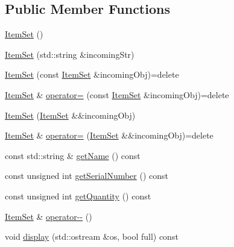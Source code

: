\subsection*{Public Member Functions}
\begin{DoxyCompactItemize}
\item 
\mbox{\hyperlink{classsict_1_1ItemSet_affbe4ff1fa57325fb27222d39fd780cb}{Item\+Set}} ()
\item 
\mbox{\hyperlink{classsict_1_1ItemSet_ae90c48652022bb74c04774fe0b59eadc}{Item\+Set}} (std\+::string \&incoming\+Str)
\item 
\mbox{\hyperlink{classsict_1_1ItemSet_ac5814fc09385ea14c8776fd3d9920d16}{Item\+Set}} (const \mbox{\hyperlink{classsict_1_1ItemSet}{Item\+Set}} \&incoming\+Obj)=delete
\item 
\mbox{\hyperlink{classsict_1_1ItemSet}{Item\+Set}} \& \mbox{\hyperlink{classsict_1_1ItemSet_a76155437cf9aef0adf0b26ed44383b85}{operator=}} (const \mbox{\hyperlink{classsict_1_1ItemSet}{Item\+Set}} \&incoming\+Obj)=delete
\item 
\mbox{\hyperlink{classsict_1_1ItemSet_a5efb673bc5cad8a35404fef1dd43a78b}{Item\+Set}} (\mbox{\hyperlink{classsict_1_1ItemSet}{Item\+Set}} \&\&incoming\+Obj)
\item 
\mbox{\hyperlink{classsict_1_1ItemSet}{Item\+Set}} \& \mbox{\hyperlink{classsict_1_1ItemSet_ae3b1dbf59c6fd7cf463459290c0421da}{operator=}} (\mbox{\hyperlink{classsict_1_1ItemSet}{Item\+Set}} \&\&incoming\+Obj)=delete
\item 
const std\+::string \& \mbox{\hyperlink{classsict_1_1ItemSet_a5182b65c6ac91c27a125641139b448cd}{get\+Name}} () const
\item 
const unsigned int \mbox{\hyperlink{classsict_1_1ItemSet_ab67dbc2189195da464da446dad1238a9}{get\+Serial\+Number}} () const
\item 
const unsigned int \mbox{\hyperlink{classsict_1_1ItemSet_a207ec2d18000dba292c70b34617917d0}{get\+Quantity}} () const
\item 
\mbox{\hyperlink{classsict_1_1ItemSet}{Item\+Set}} \& \mbox{\hyperlink{classsict_1_1ItemSet_a539f3dee79de277f30f6ebcf8453b25f}{operator-\/-\/}} ()
\item 
void \mbox{\hyperlink{classsict_1_1ItemSet_af3328f8127c80b02ce738f27a7881635}{display}} (std\+::ostream \&os, bool full) const
\end{DoxyCompactItemize}
